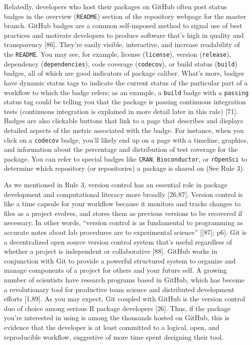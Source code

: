 \documentclass[10pt,letterpaper]{article}
\begin{document}
Relatedly, developers who host their packages on GitHub often post
status badges in the overview (\texttt{README}) section of the
repository webpage for the master branch. GitHub badges are a common
self-imposed method to signal use of best practices and motivate
developers to produce software that's high in quality and transparency
{[}86{]}. They're easily visible, interactive, and increase readability
of the \texttt{README}. You may see, for example, license
(\texttt{license}), version (\texttt{release}), dependency
(\texttt{dependencies}), code coverage (\texttt{codecov}), or build
status (\texttt{build}) badges, all of which are good indicators of
package caliber. What's more, badges have dynamic status tags to
indicate the current status of the particular part of a workflow to
which the badge refers; as an example, a \texttt{build} badge with a
\texttt{passing} status tag could be telling you that the package is
passing continuous integration tests (continuous integration is
explained in more detail later in this rule) {[}71{]}. Badges are also
clickable buttons that link to a page that describes and displays
detailed aspects of the metric associated with the badge. For instance,
when you click on a \texttt{codecov} badge, you'll likely end up on a
page with a timeline, graphics, and information about the percentage and
distribution of test coverage for the package. You can refer to special
badges like \texttt{CRAN}, \texttt{Bioconductor}, or \texttt{rOpenSci}
to determine which repository (or repositories) a package is shared on
(See Rule 3).

As we mentioned in Rule 3, version control has an essential role in
package development and computational literacy more broadly {[}26,87{]}.
Version control is like a time capsule for your workflow because it
monitors and tracks changes to files as a project evolves, and stores
them as previous versions to be recovered if necessary. In other words,
``version control is as fundamental to programming as accurate notes
about lab procedures are to experimental science'' {[}{[}87{]}; p6{]}.
Git is a decentralized open source version control system that's useful
regardless of whether a project is independent or collaborative
{[}88{]}. GitHub works in conjunction with Git to provide a powerful
structured system to organize and manage components of a project for
others and your future self. A growing number of scientists have
research programs based in GitHub, which has become a revolutionary tool
for productive team science and distributed development efforts
{[}1,89{]}. As you may expect, Git coupled with GitHub is the version
control duo of choice among serious R package developers {[}26{]}. Thus,
if the package you're interested in using is among the thousands hosted
on GitHub, this is evidence that the developer is at least committed to
a logical, open, and reproducible workflow, suggestive of more time
spent designing their tool.
\end{document}
